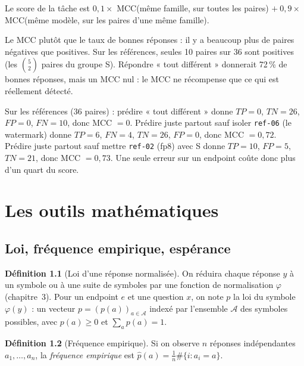 \documentclass[11pt,a4paper]{report}
\theoremstyle{definition}
\newtheorem{definition}{Définition}[chapter]
\theoremstyle{plain}
\newcommand{\code}[1]{\texttt{#1}}
\begin{document}
Le score de la tâche est $0{,}1\times$ MCC(même famille, sur toutes les paires) $+\ 0{,}9\times$ MCC(même modèle, sur les paires d'une même famille).

\begin{pourquoi}
Le MCC plutôt que le taux de bonnes réponses : il y a beaucoup plus de paires négatives que positives. Sur les références, seules 10 paires sur 36 sont positives (les $\binom52$ paires du groupe S). Répondre « tout différent » donnerait 72\,\% de bonnes réponses, mais un MCC nul : le MCC ne récompense que ce qui est réellement détecté.
\end{pourquoi}

\begin{exemple}
Sur les références (36 paires) : prédire « tout différent » donne $TP=0$, $TN=26$, $FP=0$, $FN=10$, donc MCC $=0$. Prédire juste partout sauf isoler \code{ref-06} (le watermark) donne $TP=6$, $FN=4$, $TN=26$, $FP=0$, donc MCC $=0{,}72$. Prédire juste partout sauf mettre \code{ref-02} (fp8) avec S donne $TP=10$, $FP=5$, $TN=21$, donc MCC $=0{,}73$. Une seule erreur sur un endpoint coûte donc plus d'un quart du score.
\end{exemple}

\chapter{Les outils mathématiques}

\section{Loi, fréquence empirique, espérance}

\begin{definition}[Loi d'une réponse normalisée]
On réduira chaque réponse $y$ à un symbole ou à une suite de symboles par une fonction de normalisation $\varphi$ (chapitre~3). Pour un endpoint $e$ et une question $x$, on note $p$ la loi du symbole $\varphi(y)$ : un vecteur $p=(p(a))_{a\in\mathcal A}$ indexé par l'ensemble $\mathcal A$ des symboles possibles, avec $p(a)\ge0$ et $\sum_a p(a)=1$.
\end{definition}

\begin{definition}[Fréquence empirique]
Si on observe $n$ réponses indépendantes $a_1,\dots,a_n$, la \emph{fréquence empirique} est $\hat p(a) = \frac1n\#\{i : a_i = a\}$.
\end{definition}
\end{document}
